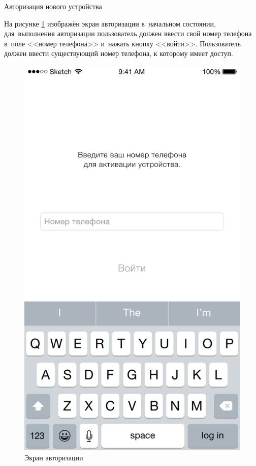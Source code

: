 \subsubsection{} Авторизация нового устройства
\label{sec:usage:auth:auth}

На рисунке \ref{sec:usage:auth:auth:login-empty} изображён экран авторизации в~начальном состоянии, для~выполнения авторизации пользователь должен ввести свой номер телефона в~поле <<номер телефона>> и~нажать кнопку <<войти>>. Пользователь должен ввести существующий номер телефона, к которому имеет доступ.

\begin{figure}[h]
  \centering
    \includegraphics[height=0.25\textheight]{inc/img/ui/login_not_entered.png}
  \caption{Экран авторизации}
  \label{sec:usage:auth:auth:login-empty}
\end{figure}